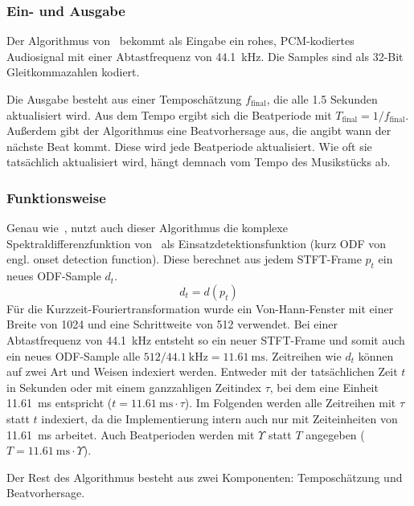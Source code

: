 {{		\subsubsection*{Ein- und Ausgabe}
		{
			Der Algorithmus von~\cite{2009_DaPlSt} bekommt als Eingabe ein rohes, PCM-kodiertes Audiosignal mit einer Abtastfrequenz von \SI{44.1}{\kilo\hertz}.
			Die Samples sind als 32-Bit Gleitkommazahlen kodiert.

			Die Ausgabe besteht aus einer Temposchätzung $f_\text{final}$,
				die alle \num{1.5} Sekunden aktualisiert wird.
			Aus dem Tempo ergibt sich die Beatperiode mit $T_\text{final} = 1 / f_\text{final}$.
			Au{\ss}erdem gibt der Algorithmus eine Beatvorhersage aus,
				die angibt wann der nächste Beat kommt.
			Diese wird jede Beatperiode aktualisiert.
			Wie oft sie tatsächlich aktualisiert wird,
				hängt demnach vom Tempo des Musikstücks ab.
		}

		\subsubsection*{Funktionsweise}
		{
			Genau wie~\cite{2011_PlRoSt},
				nutzt auch dieser Algorithmus die komplexe Spektraldifferenzfunktion von~\cite{2004_BeDaDuSa}
				als Einsatzdetektionsfunktion (kurz ODF von engl. onset detection function).
			Diese berechnet aus jedem STFT-Frame $p_t$ ein neues ODF-Sample $d_t$.
			\begin{equation}
				d_t = d(p_t)
			\end{equation}
			Für die Kurzzeit-Fouriertransformation wurde ein Von-Hann-Fenster mit einer Breite von \num{1024} und eine Schrittweite von \num{512} verwendet.
			Bei einer Abtastfrequenz von \SI{44.1}{\kilo\hertz} entsteht so ein neuer STFT-Frame
				und somit auch ein neues ODF-Sample
				alle $512 / \SI{44.1}{\kilo\hertz} = \SI{11.61}{\milli\second}$.
			Zeitreihen wie $d_t$ können auf zwei Art und Weisen indexiert werden.
			Entweder mit der tatsächlichen Zeit $t$ in Sekunden
				oder mit einem ganzzahligen Zeitindex $\tau$,
				bei dem eine Einheit \SI{11.61}{\milli\second} entspricht
				($t = \SI{11.61}{\milli\second} \cdot \tau$).
			Im Folgenden werden alle Zeitreihen mit $\tau$ statt $t$ indexiert,
				da die Implementierung intern auch nur mit Zeiteinheiten von \SI{11.61}{\milli\second} arbeitet.
			Auch Beatperioden werden mit $\Upsilon$ statt $T$ angegeben ($T = \SI{11.61}{\milli\second} \cdot \Upsilon$).

			Der Rest des Algorithmus besteht aus zwei Komponenten:
				Temposchätzung und Beatvorhersage.

}}}
